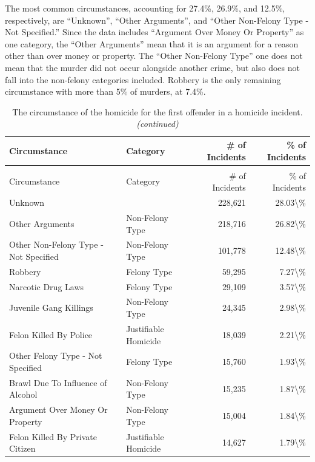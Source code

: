 \documentclass[
]{krantz}
\begin{document}
The most common circumstances, accounting for 27.4\%,
26.9\%, and 12.5\%, respectively, are ``Unknown'', ``Other
Arguments'', and ``Other Non-Felony Type - Not Specified.''
Since the data includes ``Argument Over Money Or Property''
as one category, the ``Other Arguments'' mean that it is an
argument for a reason other than over money or property. The
``Other Non-Felony Type'' one does not mean that the murder
did not occur alongside another crime, but also does not
fall into the non-felony categories included. Robbery is the
only remaining circumstance with more than 5\% of murders,
at 7.4\%.

\begin{longtable}[t]{l|l|r|r}
\caption{\label{tab:shrCircumstance}The circumstance of the homicide for the first offender in a homicide incident.}\\
\hline
Circumstance & Category & \# of Incidents & \% of Incidents\\
\hline
\endfirsthead
\caption[]{\label{tab:shrCircumstance}The circumstance of the homicide for the first offender in a homicide incident. \textit{(continued)}}\\
\hline
Circumstance & Category & \# of Incidents & \% of Incidents\\
\hline
\endhead
Unknown &  & 228,621 & 28.03\textbackslash{}\%\\
\hline
Other Arguments & Non-Felony Type & 218,716 & 26.82\textbackslash{}\%\\
\hline
Other Non-Felony Type - Not Specified & Non-Felony Type & 101,778 & 12.48\textbackslash{}\%\\
\hline
Robbery & Felony Type & 59,295 & 7.27\textbackslash{}\%\\
\hline
Narcotic Drug Laws & Felony Type & 29,109 & 3.57\textbackslash{}\%\\
\hline
Juvenile Gang Killings & Non-Felony Type & 24,345 & 2.98\textbackslash{}\%\\
\hline
Felon Killed By Police & Justifiable Homicide & 18,039 & 2.21\textbackslash{}\%\\
\hline
Other Felony Type - Not Specified & Felony Type & 15,760 & 1.93\textbackslash{}\%\\
\hline
Brawl Due To Influence of Alcohol & Non-Felony Type & 15,235 & 1.87\textbackslash{}\%\\
\hline
Argument Over Money Or Property & Non-Felony Type & 15,004 & 1.84\textbackslash{}\%\\
\hline
Felon Killed By Private Citizen & Justifiable Homicide & 14,627 & 1.79\textbackslash{}\%\\

\end{longtable}
\end{document}

